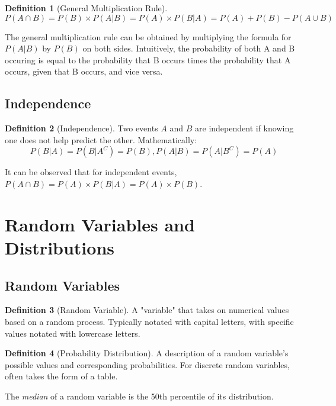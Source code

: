 \documentclass[12pt, a4paper]{article}
\theoremstyle{definition}
\newtheorem{definition}{Definition}
\begin{document}
\begin{definition}[General Multiplication Rule]
    \[P(A \cap B) = P(B) \times P(A | B) = P(A) \times P(B | A) = P(A) + P(B) - P(A \cup B)\]
\end{definition}

The general multiplication rule can be obtained by multiplying the formula for $P(A | B)$ by $P(B)$ on both sides.
Intuitively, the probability of both A and B occuring is equal to the probability that B occurs times the probability that A occurs, given that B occurs, and vice versa.

\subsection{Independence}

\begin{definition}[Independence]
    Two events $A$ and $B$ are independent if knowing one does not help predict the other.
    Mathematically:
    \[P(B | A) = P(B | A^C) = P(B), P(A | B) = P(A | B^C) = P(A)\]
\end{definition}

It can be observed that for independent events, $P(A \cap B) = P(A) \times P(B | A) = P(A) \times P(B)$.

\newpage

\section{Random Variables and Distributions}

\subsection{Random Variables}

\begin{definition}[Random Variable]
    A "variable" that takes on numerical values based on a random process.
    Typically notated with capital letters, with specific values notated with lowercase letters.
\end{definition}

\begin{definition}[Probability Distribution]
    A description of a random variable's possible values and corresponding probabilities.
    For discrete random variables, often takes the form of a table.
\end{definition}

The \textit{median} of a random variable is the 50th percentile of its distribution.
\end{document}
